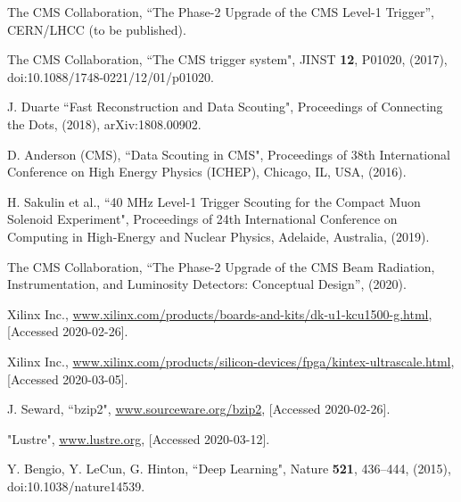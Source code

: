 \documentclass[10pt, paper=a4, UKenglish]{article}
\begin{document}

\begin{thebibliography}{99}



  The CMS Collaboration, 
  “The Phase-2 Upgrade of the CMS Level-1 Trigger”,
  CERN/LHCC (to be published).
    
  The CMS Collaboration,
  “The CMS trigger system",
  JINST {\bf 12}, P01020, (2017),
  doi:10.1088/1748-0221/12/01/p01020.

  J. Duarte
  “Fast Reconstruction and Data Scouting",
  Proceedings of Connecting the Dots, (2018),
  arXiv:1808.00902.

  D. Anderson (CMS),
  “Data Scouting in CMS",
  Proceedings of 38th International Conference on High Energy Physics (ICHEP), Chicago, IL, USA, (2016).

  H. Sakulin et al.,
  “40 MHz Level-1 Trigger Scouting for the Compact Muon Solenoid Experiment",
  Proceedings of 24th International Conference on Computing in High-Energy and Nuclear Physics, Adelaide, Australia, (2019).
  
  The CMS Collaboration,
  “The Phase-2 Upgrade of the CMS Beam Radiation, Instrumentation, and Luminosity Detectors: Conceptual Design”,
  (2020).

  Xilinx Inc.,
  \url{www.xilinx.com/products/boards-and-kits/dk-u1-kcu1500-g.html},
  [Accessed 2020-02-26].
  
  Xilinx Inc.,
  \url{www.xilinx.com/products/silicon-devices/fpga/kintex-ultrascale.html},
  [Accessed 2020-03-05].

  J. Seward,
  “bzip2",
  \url{www.sourceware.org/bzip2},
  [Accessed 2020-02-26].

  "Lustre",
  \url{www.lustre.org},
  [Accessed 2020-03-12].
  
  Y. Bengio, Y. LeCun, G. Hinton,
  “Deep Learning",
  Nature {\bf 521}, 436–444, (2015),
  doi:10.1038/nature14539.
  

\end{thebibliography}
\end{document}
